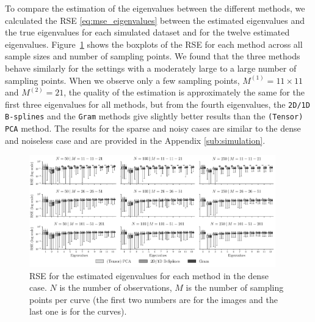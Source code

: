 \begin{results}
To compare the estimation of the eigenvalues between the different methods, we calculated the RSE \eqref{eq:mse_eigenvalues} between the estimated eigenvalues and the true eigenvalues for each simulated dataset and for the twelve estimated eigenvalues.
Figure~\ref{fig:logAE_mfd_1d} shows the boxplots of the RSE for each method across all sample sizes and number of sampling points. We found that the three methods behave similarly for the settings with a moderately large to a large number of sampling points. When we observe only a few sampling points, $M^{(1)} = 11 \times 11$ and $M^{(2)} = 21$, the quality of the estimation is approximately the same for the first three eigenvalues for all methods, but from the fourth eigenvalues, the \texttt{2D/1D B-splines} and the \texttt{Gram} methods give slightly better results than the \texttt{(Tensor) PCA} method. The results for the sparse and noisy cases are similar to the dense and noiseless case and are provided in the Appendix \ref{sub:simulation}.

\begin{figure}
    \centering
    \includegraphics[width=0.95\textwidth]{figures/AE}
    \caption{RSE for the estimated eigenvalues for each method in the dense case. $N$ is the number of observations, $M$ is the number of sampling points per curve (the first two numbers are for the images and the last one is for the curves).}
    \label{fig:logAE_mfd_1d}
\end{figure}
\end{results}

